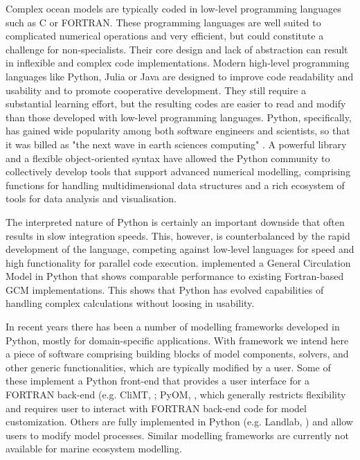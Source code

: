 \documentclass[journal abbreviation, manuscript]{copernicus}
\begin{document}
Complex ocean models are typically coded in low-level programming languages such as C or FORTRAN. These programming languages are well suited to complicated numerical operations and very efficient, but could constitute a challenge for non-specialists. Their core design and lack of abstraction can result in inflexible and complex code implementations.
Modern high-level programming languages like Python, Julia or Java are designed to improve code readability and usability and to promote cooperative development. They still require a substantial learning effort, but the resulting codes are easier to read and modify than those developed with low-level programming languages. Python, specifically, has gained wide popularity among both software engineers and scientists, so that it was billed as "the next wave in earth sciences computing" \citep{Lin2012}. A powerful library and a flexible object-oriented syntax have allowed the Python community to collectively develop tools that support advanced numerical modelling, comprising functions for handling multidimensional data structures and a rich ecosystem of tools for data analysis and visualisation.

The interpreted nature of Python is certainly an important downside that often results in slow integration speeds. This, however, is counterbalanced by the rapid development of the language, competing against low-level languages for speed and high functionality for parallel code execution. \citet{Hafner2018VerosPython} implemented a General Circulation Model in Python that shows comparable performance to existing Fortran-based GCM implementations. This shows that Python has evolved capabilities of handling complex calculations without loosing in usability.

In recent years there has been a number of modelling frameworks developed in Python, mostly for domain-specific applications. With framework we intend here a piece of software comprising building blocks of model components, solvers, and other generic functionalities, which are typically modified by a user. Some of these implement a Python front-end that provides a user interface for a FORTRAN back-end (e.g. CliMT, \citet{Monteiro2016TheToolkit}; PyOM, \citet{Eden2016ClosingModel}, which generally restricts flexibility and requires user to interact with FORTRAN back-end code for model customization. Others are fully implemented in Python (e.g. Landlab, \citet{Hobley2017CreativeDynamics}) and allow users to  modify model processes. Similar modelling frameworks are currently not available for marine ecosystem modelling.
\end{document}

